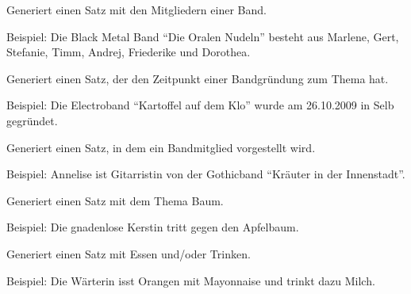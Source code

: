 \documentclass[a4paper,12pt,oneside]{sphinxmanual}
\begin{document}

\begin{fulllineitems}
\label{funktionen:pyzufall.satz_band_besetzung}
Generiert einen Satz mit den Mitgliedern einer Band.

Beispiel: Die Black Metal Band ``Die Oralen Nudeln'' besteht aus Marlene, Gert, Stefanie, Timm, Andrej, Friederike und Dorothea.

\end{fulllineitems}


\begin{fulllineitems}
\label{funktionen:pyzufall.satz_band_gegruendet}
Generiert einen Satz, der den Zeitpunkt einer Bandgründung zum Thema hat.

Beispiel: Die Electroband ``Kartoffel auf dem Klo'' wurde am 26.10.2009 in Selb gegründet.

\end{fulllineitems}


\begin{fulllineitems}
\label{funktionen:pyzufall.satz_band_mitglied}
Generiert einen Satz, in dem ein Bandmitglied vorgestellt wird.

Beispiel: Annelise ist Gitarristin von der Gothicband ``Kräuter in der Innenstadt''.

\end{fulllineitems}


\begin{fulllineitems}
\label{funktionen:pyzufall.satz_baum}
Generiert einen Satz mit dem Thema Baum.

Beispiel: Die gnadenlose Kerstin tritt gegen den Apfelbaum.

\end{fulllineitems}


\begin{fulllineitems}
\label{funktionen:pyzufall.satz_essen}
Generiert einen Satz mit Essen und/oder Trinken.

Beispiel: Die Wärterin isst Orangen mit Mayonnaise und trinkt dazu Milch.

\end{fulllineitems}
\end{document}

